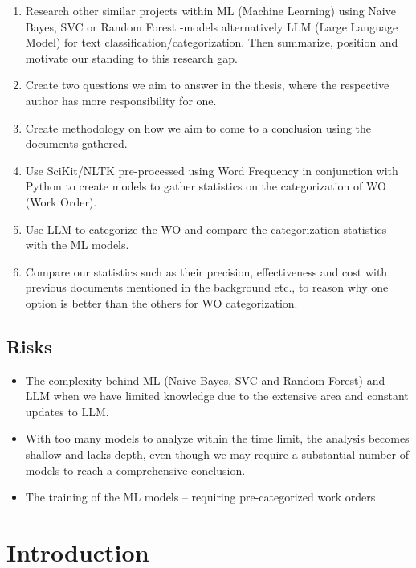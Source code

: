 \documentclass{article}
\begin{document}
\begin{enumerate}
      \item Research other similar projects within ML (Machine Learning) using Naive Bayes,
            SVC or Random Forest -models alternatively LLM (Large Language Model) for text
            classification/categorization. Then summarize, position and motivate our standing to
            this research gap.
      \item Create two questions we aim to answer in the thesis, where the respective author
            has more responsibility for one.
      \item Create methodology on how we aim to come to a conclusion using the documents gathered.
      \item Use SciKit/NLTK pre-processed using Word Frequency in conjunction with Python
            to create models to gather statistics on the categorization of WO (Work Order).
      \item Use LLM to categorize the WO and compare the categorization statistics
            with the ML models.
      \item Compare our statistics such as their precision,
            effectiveness and cost with previous documents mentioned in the background etc.,
            to reason why one option is better than the others for WO categorization.
\end{enumerate}

\subsection{Risks}

\begin{itemize}
      \item The complexity behind ML (Naive Bayes, SVC and Random Forest) and LLM when
            we have limited knowledge due to the extensive area and constant updates to LLM.
      \item With too many models to analyze within the time limit, the analysis becomes
            shallow and lacks depth, even though we may require a substantial number of models
            to reach a comprehensive conclusion.
      \item The training of the ML models -- requiring pre-categorized work orders
\end{itemize}

\section{Introduction}
\end{document}
